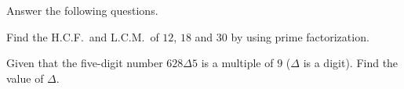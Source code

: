 Answer the following questions.

\begin{subparts}
  \item Find the H.C.F.\ and L.C.M.\ of $12$, $18$ and $30$ by using prime factorization.
  \item Given that the five-digit number $628\Delta 5$ is a multiple of $9$ ($\Delta$ is a digit). Find the value of $\Delta$.
\end{subparts}

